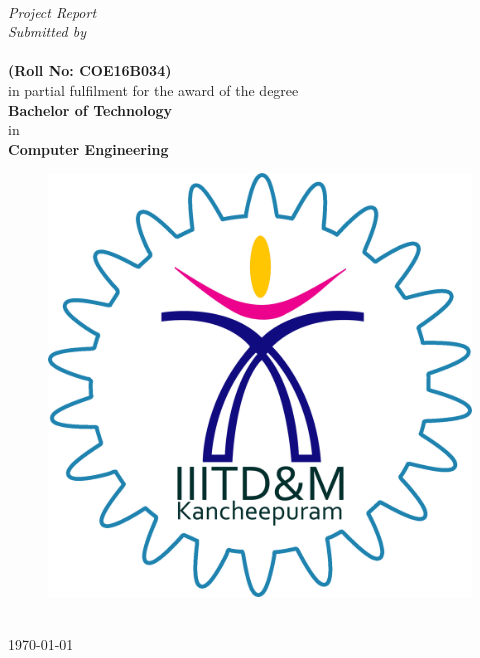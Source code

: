 \documentclass[11pt, a4paper, oneside]{Thesis} %
\begin{document}
\begin{titlepage}
\begin{center}


\vspace{0.4cm} %
{\huge \bfseries \ttitle}\\[0.4cm] %
\vspace{1.5cm} %

 
 \large \textit{Project Report}\\[0.3cm] %
\textit{Submitted by}\\[0.4cm]

\authornames\\[-2mm]\hspace{-0.2cm}\textbf{ (Roll No: COE16B034)}\\[-2.5mm]
\vspace{0.75cm}
in partial fulfilment for the award of the degree\\
	\vspace{0.75cm}
	\large {\bf Bachelor of Technology}\\
		\vspace{0.25cm}
	in\\
		\vspace{0.25cm}
	\large {\bf Computer Engineering}

\vfill
\graphicspath{ {./Figures/} }
\begin{figure}[hb]
  \centering
  \includegraphics[width=0.35\linewidth]{iiitdm.png}
\end{figure}

\textsc{ \UNIVNAME}\\[1.5cm] %
\large \today\\[2cm] %


\end{center}

\end{titlepage}
\end{document}
